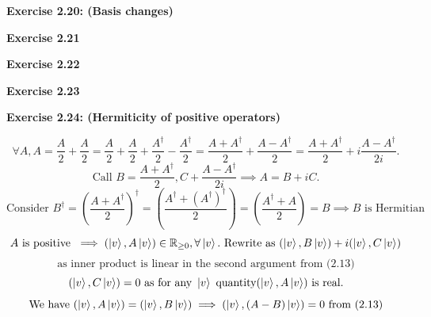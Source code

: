 \documentclass{article}
\begin{document}
\bigskip

\begin{framed}
    \noindent \textbf{Exercise 2.20: (Basis changes)}
    
    \medskip
    
    
\end{framed}

\bigskip

\begin{framed}
    \noindent \textbf{Exercise 2.21}
    
    \medskip
    
    
\end{framed}

\bigskip

\begin{framed}
    \noindent \textbf{Exercise 2.22}
    
    \medskip
    
    
\end{framed}

\bigskip

\begin{framed}
    \noindent \textbf{Exercise 2.23}
    
    \medskip
    
    
\end{framed}

\bigskip

\begin{framed}
    \noindent \textbf{Exercise 2.24: (Hermiticity of positive operators)}
    
    \medskip

    $$\forall A, A = \frac{A}{2} + \frac{A}{2} = \frac{A}{2} + \frac{A}{2} + \frac{A^{\dagger}}{2} - \frac{A^{\dagger}}{2} = \frac{A + A^{\dagger}}{2} + \frac{A -A^{\dagger}}{2} = \frac{A + A^{\dagger}}{2} + i\frac{A -A^{\dagger}}{2i}.
    $$
    $$
    \text{Call } B = \frac{A + A^{\dagger}}{2} , C + \frac{A -A^{\dagger}}{2i} \implies A = B + iC.
    $$
    $$
    \text{Consider } B^{\dagger} = (\frac{A + A^{\dagger}}{2})^{\dagger} = (\frac{A^{\dagger} + (A^{\dagger})^{\dagger}}{2}) = (\frac{A^{\dagger} + A}{2}) = B \implies B \text{ is Hermitian}
    $$
    $$
    A \text{ is positive } \implies (\ket{v}, A\ket{v}) \in \mathbb{R}_{\geq 0} , \forall\ket{v}. \text{ Rewrite as } (\ket{v}, B\ket{v}) + i(\ket{v}, C\ket{v})
    $$
    $$
    \text{as inner product is linear in the second argument from (2.13)}
    $$
    $$
    (\ket{v}, C\ket{v}) = 0 \text{ as for any } \ket{v} \text{ quantity} (\ket{v}, A\ket{v}) \text{ is real}.
    $$
    $$
    \text{We have } (\ket{v}, A\ket{v}) = (\ket{v}, B\ket{v}) \implies (\ket{v}, (A-B)\ket{v}) = 0 \text{ from } (2.13)
    $$
    
\end{framed}
\end{document}
